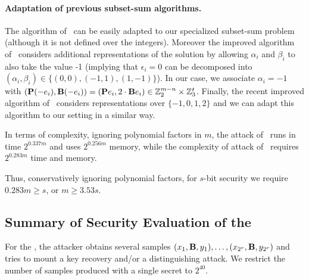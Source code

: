 \paragraph{Adaptation of previous subset-sum algorithms.}
The algorithm of~\cite{Howgrave-GrahamJ10} can be easily adapted
to our specialized subset-sum problem (although it is not defined over the integers).
Moreover the improved algorithm of~\cite{BeckerCJ11} considers additional representations
of the solution by allowing $\alpha_i$ and $\beta_i$ to also take the value -1
(implying that $\epsilon_i = 0$ can be decomposed into
$(\alpha_i,\beta_i) \in \{(0,0),(-1,1),(1,-1)\}$).
In our case, we associate $\alpha_i = -1$
with $(\mat{P}(-e_i), \mat{B}(-e_i)) = (\mat{P}e_i, 2 \cdot \mat{B}e_i)  \in \Z_2^{m-n} \times \Z_3^t$.
Finally, the recent improved algorithm of~\cite{BonnetainBSS20} considers representations over
$\{-1,0,1,2\}$ and we can adapt this algorithm to our setting in a similar way.

In terms of complexity, ignoring polynomial factors in $m$,
the attack of~\cite{Howgrave-GrahamJ10} runs in time $2^{0.337m}$ and uses $2^{0.256m}$ memory,
while the complexity of attack of~\cite{BonnetainBSS20} requires $2^{0.283m}$ time and memory.

Thus, conservatively ignoring polynomial factors, for $s$-bit security we require $0.283m \geq s$, or $m \geq 3.53 s$.

\subsection{Summary of Security Evaluation of the \ttwPRF}

For the \ttwPRF, the attacker obtains several samples
$(x_1,\mat{B},y_1) ,\ldots, (x_{2^r},
\mat{B},y_{2^r})$
and tries to
mount a key recovery and/or a distinguishing attack.
We restrict the number of samples produced with a single secret to $2^{40}$.

